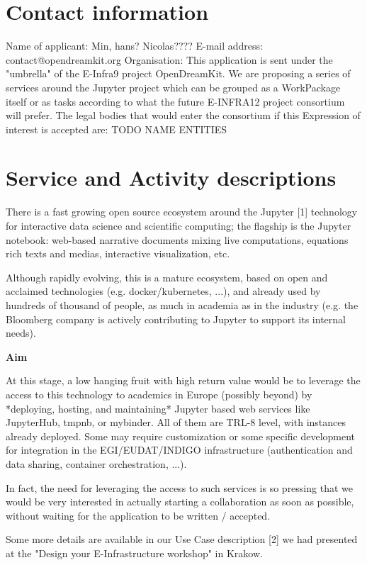 \section{Contact information}

Name of applicant: Min, hans? Nicolas????
E-mail address: contact@opendreamkit.org
Organisation: This application is sent under the "umbrella" of the E-Infra9
project OpenDreamKit. We are proposing a series of services around the
Jupyter project which can be grouped as a WorkPackage itself or as
tasks according to what the future E-INFRA12 project consortium will
prefer. The legal bodies that would enter the consortium if this Expression
of interest is accepted are: TODO NAME ENTITIES

\section{Service and Activity descriptions}

There is a fast growing open source ecosystem around the Jupyter [1]
technology for interactive data science and scientific computing; the
flagship is the Jupyter notebook: web-based narrative documents mixing
live computations, equations rich texts and medias, interactive
visualization, etc.

Although rapidly evolving, this is a mature ecosystem, based on open
and acclaimed technologies (e.g. docker/kubernetes, ...), and already
used by hundreds of thousand of people, as much in academia as in the
industry (e.g. the Bloomberg company is actively contributing to
Jupyter to support its internal needs).

\textbf{Aim}

At this stage, a low hanging fruit with high return value would be to
leverage the access to this technology to academics in Europe
(possibly beyond) by *deploying, hosting, and maintaining* Jupyter
based web services like JupyterHub, tmpnb, or mybinder. All of them
are TRL-8 level, with instances already deployed. Some may require
customization or some specific development for integration in the
EGI/EUDAT/INDIGO infrastructure (authentication and data sharing,
container orchestration, ...).

In fact, the need for leveraging the access to such services is so
pressing that we would be very interested in actually starting a
collaboration as soon as possible, without waiting for the application
to be written / accepted.

Some more details are available in our Use Case description [2] we had
presented at the "Design your E-Infrastructure workshop" in Krakow.

